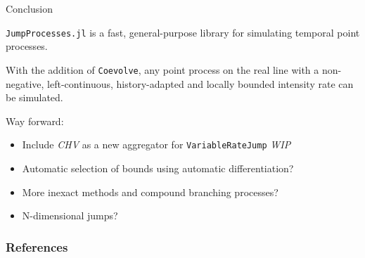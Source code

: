 \documentclass[
  ignorenonframetext,
  aspectratio=169,
  xcolor={dvipsnames,rgb}
]{beamer}
\begin{document}
\begin{frame}{Conclusion}

\texttt{JumpProcesses.jl} is a fast, general-purpose library for simulating temporal point processes. 

With the addition of \texttt{Coevolve}, any point process on the real line with a non-negative, left-continuous, history-adapted and locally bounded intensity rate can be simulated.

Way forward:

\begin{itemize}

  \item Include \textit{CHV} as a new aggregator for \texttt{VariableRateJump} \textit{WIP}

  \item Automatic selection of bounds using automatic differentiation?

  \item More inexact methods and compound branching processes?

  \item N-dimensional jumps?

\end{itemize}

\end{frame}

\begin{frame}
  \thispagestyle{empty@titlepage}
  \begingroup
  \endgroup
\end{frame}

\begin{frame}[t,allowframebreaks]
  \frametitle{References}
  \printbibliography[heading=none]
\end{frame}
\end{document}
